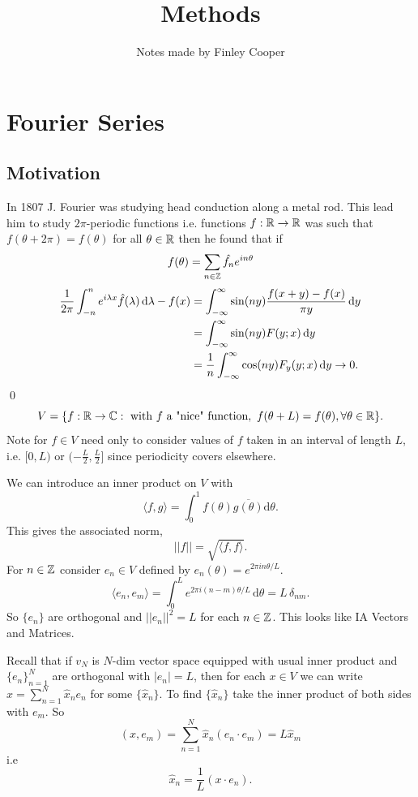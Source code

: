\documentclass{article}
\title{Methods}
\author{Notes made by Finley Cooper}
\begin{document}
\maketitle
\newpage
\tableofcontents
\newpage
\section{Fourier Series}
\subsection{Motivation}
In 1807 J. Fourier was studying head conduction along a metal rod. This lead him to study $ 2\pi $-periodic functions i.e. functions $ f:\mathbb{R}\to \mathbb{R} $ was such that $ f(\theta+2\pi)=f(\theta) $ for all $ \theta\in \mathbb{R} $ then he found that if
\[
	f(\theta)=\sum_{n\in\mathbb{Z}}\hat{f_n}e^{in\theta}
\]
\begin{align*}
	\frac{1}{2\pi}\int_{-n}^n e^{i\lambda x}\hat f(\lambda)\,\mathrm d\lambda - f(x)
	&= \int_{-\infty}^\infty \sin(ny)\frac{f(x+y)-f(x)}{\pi y}\,\mathrm dy\\
	&= \int_{-\infty}^\infty \sin(ny)F(y;x)\,\mathrm dy\\
	&= \frac{1}{n}\int_{-\infty}^\infty \cos(ny)F_y(y;x)\,\mathrm dy \to 0.
\end{align*}
\qed
\[
	V=\{f:\mathbb{R}\to\mathbb{C}:\text{ with } f \text{ a "nice" function},\text { } f(\theta+L)=f(\theta), \forall \theta\in\mathbb{R}\}.
\]
Note for $ f\in V $ need only to consider values of $ f $ taken in an interval of length $ L $, i.e. $ [0,L) $ or $ (-\frac L2,\frac L2] $ since periodicity covers elsewhere.\par
We can introduce an inner product on $ V $ with
\[
	\langle f,g\rangle=\int_0^1f(\theta)\overline{g(\theta)}\mathrm d\theta.
\]
This gives the associated norm,
\[
	||f||=\sqrt{\langle f,f\rangle}.
\]
For $ n\in \mathbb{Z} $ consider $ e_n\in V $ defined by $ e_n(\theta)=e^{2\pi i n\theta / L }$.
\[
\langle e_n,e_m\rangle = \int_0^L e^{2\pi i (n-m)\theta / L}\,\mathrm d\theta = L\,\delta_{nm}.
\]
So $ \{e_n\} $ are orthogonal and $ ||e_n||^2=L $ for each $ n\in \mathbb{Z} $. This looks like IA Vectors and Matrices.\par
Recall that if $ v_N $ is $ N $-dim vector space equipped with usual inner product and $ \{ e_n\}^N_{n=1} $ are orthogonal with $ | e_n|=L $, then for each $  x\in V $ we can write $  x = \sum_{n=1}^N \hat{x}_n{e_n} $ for some $ \{\hat {x}_n\} $. To find $ \{\hat{x}_n\} $ take the inner product of both sides with $  e_m $. So
\[
	( x,  e_m)=\sum_{n=1}^N \hat{x}_n( e_n\cdot  e_m)=L\hat{x}_m
\]
i.e
\[
\hat x_n = \frac 1L( x\cdot  e_n).
\]
\end{document}
